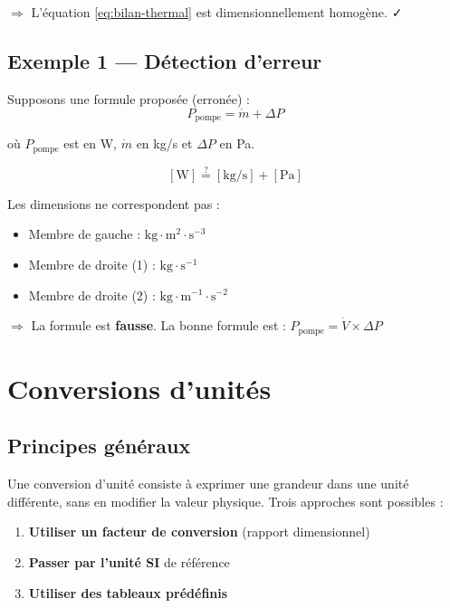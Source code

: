 $\Rightarrow$ L'équation \eqref{eq:bilan-thermal} est dimensionnellement homogène. ✓

\subsection*{Exemple 1 — Détection d'erreur}

Supposons une formule proposée (erronée) :
\begin{equation*}
  P_{\text{pompe}} = \dot{m} + \Delta P
\end{equation*}

où $P_{\text{pompe}}$ est en W, $\dot{m}$ en kg/s et $\Delta P$ en Pa.

\[
  [\mathrm{W}] \stackrel{?}{=} [\mathrm{kg/s}] + [\mathrm{Pa}]
\]

Les dimensions ne correspondent pas :
\begin{itemize}
  \item Membre de gauche : $\mathrm{kg \cdot m^2 \cdot s^{-3}}$
  \item Membre de droite (1) : $\mathrm{kg \cdot s^{-1}}$
  \item Membre de droite (2) : $\mathrm{kg \cdot m^{-1} \cdot s^{-2}}$
\end{itemize}

$\Rightarrow$ La formule est \textbf{fausse}. La bonne formule est : $P_{\text{pompe}} = \dot{V}
\times \Delta P$

\section{Conversions d'unités}

\subsection{Principes généraux}

Une conversion d'unité consiste à exprimer une grandeur dans une unité différente, sans en
modifier la valeur physique. Trois approches sont possibles :

\begin{enumerate}
  \item \textbf{Utiliser un facteur de conversion} (rapport dimensionnel)
  \item \textbf{Passer par l'unité SI} de référence
  \item \textbf{Utiliser des tableaux prédéfinis}
\end{enumerate}

